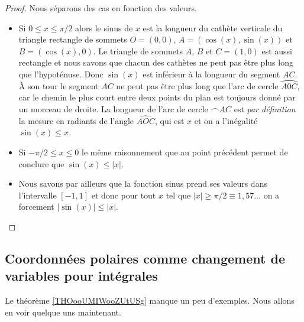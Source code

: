 \begin{proof}
        Nous séparons des cas en fonction des valeurs.
    \begin{itemize}
    \item Si $0\leq x\leq \pi/2$ alors le sinus de $x$ est la longueur du cathète verticale du triangle rectangle de sommets $O = (0,0)$, $A = (\cos(x), \sin(x))$ et $B = (\cos(x), 0)$. Le triangle de sommets $A$, $B$ et $C = (1, 0)$ est aussi rectangle et nous savons que chacun des cathètes ne peut pas être plus long que l'hypoténuse. Donc $\sin(x)$ est inférieur à la longueur du segment $AC$. À son tour le segment $AC$ ne peut pas être plus long que l'arc de cercle $\wideparen{A0C}$, car le chemin le plus court entre deux points du plan est toujours donné par un morceau de droite. La longueur de l'arc de cercle $\frown{AC}$ est \emph{par définition} la mesure en radiants de l'angle $\widehat{AOC}$, qui est $x$ et on a l'inégalité $\sin(x)\leq x$. 
    \item Si $-\pi/2\leq x\leq 0$ le m\^eme raisonnement que au point précédent permet de conclure que $\sin(x)\leq |x|$.
    \item Nous savons par ailleurs que la fonction sinus prend ses valeurs dans l'intervalle $[-1,1]$ et donc pour tout $x$ tel que $|x|\geq \pi/2 \equiv 1,57\ldots$ on a forcement $|\sin(x)|\leq |x|$.  
    \end{itemize}
\end{proof}

\subsection{Coordonnées polaires comme changement de variables pour intégrales}
\label{SUBSECooUUAKooMSJHsL}

Le théorème \ref{THOooUMIWooZUtUSg} manque un peu d'exemples. Nous allons en voir quelque uns maintenant.

